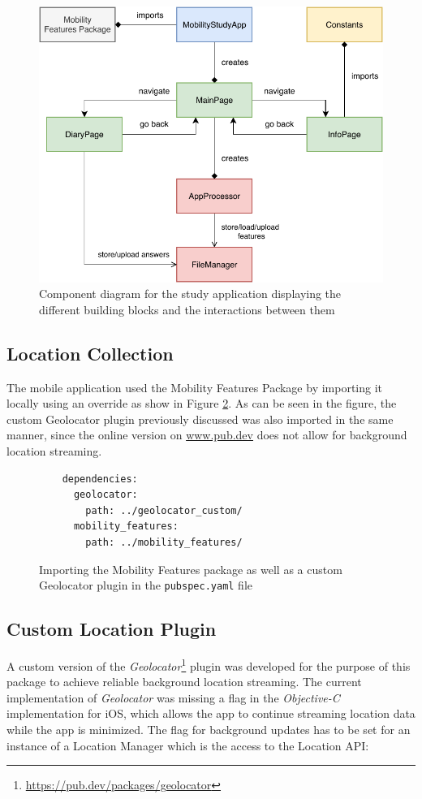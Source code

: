 \begin{figure}
    \centering
    \includegraphics[width=\textwidth]{images/diagrams/app-diagram.pdf}
    \caption{Component diagram for the study application displaying the different building blocks and the interactions between them}
    \label{fig:app-component-diagram}
\end{figure}


\subsection{Location Collection}
The mobile application used the Mobility Features Package by importing it locally using an override as show in Figure \ref{fig:import-package}. As can be seen in the figure, the custom Geolocator plugin previously discussed was also imported in the same manner, since the online version on \url{www.pub.dev} does not allow for background location streaming. 

\begin{figure}
    \centering
    \begin{verbatim}
    dependencies:
      geolocator:
        path: ../geolocator_custom/
      mobility_features:
        path: ../mobility_features/
    \end{verbatim}
    \caption{Importing the Mobility Features package as well as a custom Geolocator plugin in the \verb|pubspec.yaml| file}
    \label{fig:import-package}
\end{figure}

\subsection{Custom Location Plugin}
A custom version of the \textit{Geolocator}\footnote{\url{https://pub.dev/packages/geolocator}} plugin was developed for the purpose of this package to achieve reliable background location streaming. The current implementation of \textit{Geolocator} was missing a flag in the \textit{Objective-C} implementation for iOS, which allows the app to continue streaming location data while the app is minimized. The flag for background updates has to be set for an instance of a Location Manager which is the access to the Location API:

